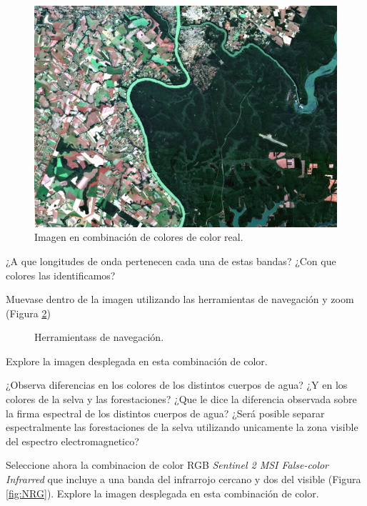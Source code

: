 \documentclass[a4paper,12pt]{book}
\begin{document}
\begin{figure}[h]
    \centering
    \includegraphics{fig:RVA.png}
    \caption{Imagen en combinación de colores de color real.}
    \label{fig:RVA}
\end{figure}

\begin{que}
    ¿A que longitudes de onda pertenecen cada una de estas bandas? ¿Con que colores las identificamos?
\end{que}

Muevase dentro de la imagen utilizando las herramientas de navegación y zoom (Figura \ref{fig:NAV})

\begin{figure}[h]
    \caption{Herramientass de navegación.}
    \label{fig:NAV}
\end{figure}

Explore la imagen desplegada en esta combinación de color.

\begin{que}
    ¿Observa diferencias en los colores de los distintos cuerpos de agua? ¿Y en los colores de la selva y las forestaciones? ¿Que le dice la diferencia observada sobre la firma espectral de los distintos cuerpos de agua? ¿Será posible separar espectralmente las forestaciones de la selva utilizando unicamente la zona visible del espectro electromagnetico?
\end{que}

Seleccione ahora la combinacion de color RGB \emph{Sentinel 2 MSI False-color Infrarred} que incluye a una banda del infrarrojo cercano y dos del visible (Figura \ref{fig:NRG}). Explore la imagen desplegada en esta combinación de color.
\end{document}
